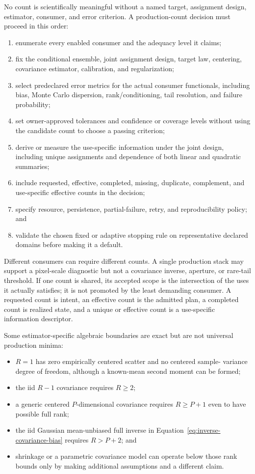 \documentclass[11pt]{article}
\begin{document}
No count is scientifically meaningful without a named target, assignment
design, estimator, consumer, and error criterion.  A production-count decision
must proceed in this order:
\begin{enumerate}
\item enumerate every enabled consumer and the adequacy level it claims;
\item fix the conditional ensemble, joint assignment design, target law,
centering, covariance estimator, calibration, and regularization;
\item select predeclared error metrics for the actual consumer functionals,
including bias, Monte Carlo dispersion, rank/conditioning, tail resolution,
and failure probability;
\item set owner-approved tolerances and confidence or coverage levels without
using the candidate count to choose a passing criterion;
\item derive or measure the use-specific information under the joint design,
including unique assignments and dependence of both linear and quadratic
summaries;
\item include requested, effective, completed, missing, duplicate, complement,
and use-specific effective counts in the decision;
\item specify resource, persistence, partial-failure, retry, and reproducibility
policy; and
\item validate the chosen fixed or adaptive stopping rule on representative
declared domains before making it a default.
\end{enumerate}

Different consumers can require different counts.  A single production stack
may support a pixel-scale diagnostic but not a covariance inverse, aperture,
or rare-tail threshold.  If one count is shared, its accepted scope is the
intersection of the uses it actually satisfies; it is not promoted by the
least demanding consumer.  A requested count is intent, an effective count is
the admitted plan, a completed count is realized state, and a unique or
effective count is a use-specific information descriptor.

Some estimator-specific algebraic boundaries are exact but are not universal
production minima:
\begin{itemize}
\item $R=1$ has zero empirically centered scatter and no centered sample-
variance degree of freedom, although a known-mean second moment can be formed;
\item the iid $R-1$ covariance requires $R\ge2$;
\item a generic centered $P$-dimensional covariance requires $R\ge P+1$ even
to have possible full rank;
\item the iid Gaussian mean-unbiased full inverse in
Equation~\eqref{eq:inverse-covariance-bias} requires $R>P+2$; and
\item shrinkage or a parametric covariance model can operate below those rank
bounds only by making additional assumptions and a different claim.
\end{itemize}
\end{document}
